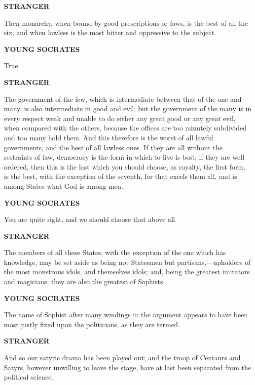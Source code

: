 \documentclass[11pt,letter]{article}
\begin{document}
\par \textbf{STRANGER}
\par   Then monarchy, when bound by good prescriptions or laws, is the best of all the six, and when lawless is the most bitter and oppressive to the subject.

\par \textbf{YOUNG SOCRATES}
\par   True.

\par \textbf{STRANGER}
\par   The government of the few, which is intermediate between that of the one and many, is also intermediate in good and evil; but the government of the many is in every respect weak and unable to do either any great good or any great evil, when compared with the others, because the offices are too minutely subdivided and too many hold them. And this therefore is the worst of all lawful governments, and the best of all lawless ones. If they are all without the restraints of law, democracy is the form in which to live is best; if they are well ordered, then this is the last which you should choose, as royalty, the first form, is the best, with the exception of the seventh, for that excels them all, and is among States what God is among men.

\par \textbf{YOUNG SOCRATES}
\par   You are quite right, and we should choose that above all.

\par \textbf{STRANGER}
\par   The members of all these States, with the exception of the one which has knowledge, may be set aside as being not Statesmen but partisans,—upholders of the most monstrous idols, and themselves idols; and, being the greatest imitators and magicians, they are also the greatest of Sophists.

\par \textbf{YOUNG SOCRATES}
\par   The name of Sophist after many windings in the argument appears to have been most justly fixed upon the politicians, as they are termed.

\par \textbf{STRANGER}
\par   And so our satyric drama has been played out; and the troop of Centaurs and Satyrs, however unwilling to leave the stage, have at last been separated from the political science.
\end{document}
